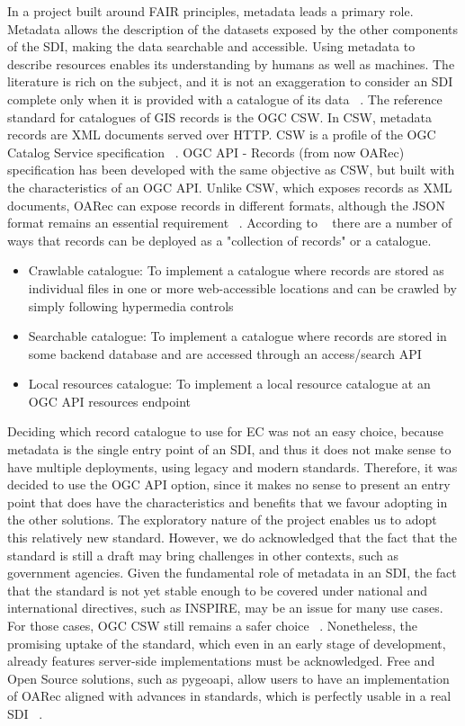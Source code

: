\documentclass{isprs} %
\begin{document}
In a project built around FAIR principles, metadata leads a primary role. Metadata allows the description of the datasets exposed by the other components of the SDI, making the data searchable and accessible. Using metadata to describe resources enables its understanding by humans as well as machines. The literature is rich on the subject, and it is not an exaggeration to consider an SDI complete only when it is provided with a catalogue of its data ~\cite{fairmetadata2022}.
The reference standard for catalogues of GIS records is the OGC CSW. In CSW, metadata records are XML documents served over HTTP. CSW is a profile of the OGC Catalog Service specification ~\cite{cat2022}.
OGC API - Records (from now OARec) specification has been developed with the same objective as CSW, but built with the characteristics of an OGC API.
Unlike CSW, which exposes records as XML documents, OARec can expose records in different formats, although the JSON format remains an essential requirement ~\cite{metadataencodings2022}.
According to ~\cite{cataloguetype2022} there are a number of ways that records can be deployed as a "collection of records" or a catalogue.
\begin{itemize}
\item {Crawlable catalogue: To implement a catalogue where records are stored as individual files in one or more web-accessible locations and can be crawled by simply following hypermedia controls}
\item {Searchable catalogue: To implement a catalogue where records are stored in some backend database and are accessed through an access/search API}
\item {Local resources catalogue: To implement a local resource catalogue at an OGC API resources endpoint}
\end{itemize}
Deciding which record catalogue to use for EC was not an easy choice, because metadata is the single entry point of an SDI, and thus it does not make sense to have multiple deployments, using legacy and modern standards. Therefore, it was decided to use the OGC API option, since it makes no sense to present an entry point that does have the characteristics and benefits that we favour adopting in the other solutions.
The exploratory nature of the project enables us to adopt this relatively new standard. However, we do acknowledged that the fact that the standard is still a draft may bring challenges in other contexts, such as government agencies. 
Given the fundamental role of metadata in an SDI, the fact that the standard is not yet stable enough to be covered under national and international directives, such as INSPIRE, may be an issue for many use cases. 
For those cases, OGC CSW still remains a safer choice ~\cite{chester2021}.
Nonetheless, the promising uptake of the standard, which even in an early stage of development, already features server-side implementations must be acknowledged. Free and Open Source solutions, such as pygeoapi, allow users to have an implementation of OARec aligned with advances in standards, which is perfectly usable in a real SDI ~\cite{ogcapirecordsimpl2022}.
\end{document}
